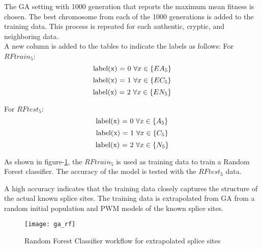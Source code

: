 	The GA setting with 1000 generation that reports the maximum mean fitness is chosen. The best chromosome from each of the 1000 generations is added to the training data. This process is repeated for each authentic, cryptic, and neighboring data.\\
	A new column is added to the tables to indicate the labels as follows:
	For $RFtrain_5$:
	$$ \textnormal{label(x) = 0 }\forall x \in \{EA_5\} $$
	$$ \textnormal{label(x) = 1 }\forall x \in \{EC_5\} $$
	$$ \textnormal{label(x) = 2 }\forall x \in \{EN_5\} $$
	
	For $RFtest_5$:
	$$ \textnormal{label(x) = 0 }\forall x \in \{A_5\} $$
	$$ \textnormal{label(x) = 1 }\forall x \in \{C_5\} $$
	$$ \textnormal{label(x) = 2 }\forall x \in \{N_5\} $$
	
	As shown in figure-\ref{fig:ga_rf}, the $RFtrain_5$ is used as training data to train a Random Forest classifier. The accuracy of the model is tested with the $RFtest_5$ data. \par
	A high accuracy indicates that the training data closely captures the structure of the actual known splice sites. The training data is extrapolated from GA from a random initial population and PWM models of the known splice sites.
	\begin{figure}[H]
		\texttt{[image: ga\_rf]}
		\caption{Random Forest Classifier workflow for extrapolated splice sites}
		\centering
		\label{fig:ga_rf}
	\end{figure}
	